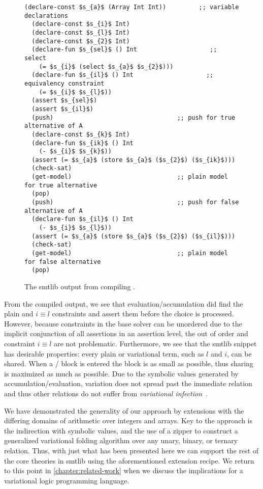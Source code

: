 \begin{figure}[h!]
  \begin{lstlisting}[columns=flexible,keepspaces=true,language=SMTLIB,breaklines=true]
  (declare-const $s_{a}$ (Array Int Int))         ;; variable declarations
  (declare-const $s_{i}$ Int)
  (declare-const $s_{l}$ Int)
  (declare-const $s_{2}$ Int)
  (declare-fun $s_{sel}$ () Int                    ;; select
    (= $s_{i}$ (select $s_{a}$ $s_{2}$)))
  (declare-fun $s_{il}$ () Int                    ;; equivalency constraint
    (= $s_{i}$ $s_{l}$))
  (assert $s_{sel}$)
  (assert $s_{il}$)
  (push)                                  ;; push for true alternative of A
  (declare-const $s_{k}$ Int)
  (declare-fun $s_{ik}$ () Int
    (- $s_{i}$ $s_{k}$))
  (assert (= $s_{a}$ (store $s_{a}$ ($s_{2}$) ($s_{ik}$)))
  (check-sat)
  (get-model)                             ;; plain model for true alternative
  (pop)
  (push)                                  ;; push for false alternative of A
  (declare-fun $s_{il}$ () Int
    (- $s_{i}$ $s_{l}$))
  (assert (= $s_{a}$ (store $s_{a}$ ($s_{2}$) ($s_{il}$)))
  (check-sat)
  (get-model)                             ;; plain model for false alternative
  (pop)
  \end{lstlisting}
  \caption{The \acl{smtlib} output from compiling \fV.}
  \label{fig:vsmt:arrays:compiled-f}
\end{figure}
%
From the compiled output, we see that evaluation/accumulation did find the plain
\select{} and $i \equiv l$ constraints and assert them before the choice is
processed. However, because constraints in the base solver can be unordered due
to the implicit conjunction of all assertions in an assertion level, the out of
order \select{} and constraint $i \equiv l$ are not problematic. Furthermore, we
see that the \acl{smtlib} snippet has desirable properties: every plain or
variational term, such as $l$ and $i$, can be shared. When a /
block is entered the block is as small as possible, thus sharing is maximized as
much as possible. Due to the symbolic values generated by
accumulation/evaluation, variation does not spread past the immediate relation
and thus other relations do not suffer from \emph{variational
  infection}~\cite{Walk14onward}.

We have demonstrated the generality of our approach by extensions with the
differing domains of arithmetic over integers and arrays. Key to the approach is
the indirection with symbolic values, and the use of a zipper to construct a
generalized variational folding algorithm over any unary, binary, or ternary
relation. Thus, with just what has been presented here we can support the rest
of the core theories in \acl{smtlib} using the aforementioned extension recipe.
We return to this point in \autoref{chapter:related-work} when we discuss the
implications for a variational logic programming language.

